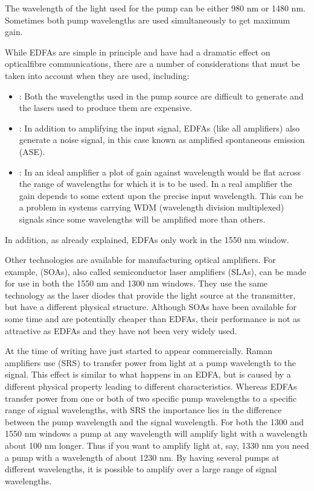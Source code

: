 \documentclass[letterpaper,10pt,english]{sphinxmanual}
\begin{document}
The wavelength of the light used for the pump can be either 980 nm or 1480 nm. Sometimes both pump wavelengths are used simultaneously to get maximum gain.

While EDFAs are simple in principle and have had a dramatic effect on optical\sphinxhyphen{}fibre communications, there are a number of considerations that must be taken into account when they are used, including:
\begin{itemize}
\item {} 
: Both the wavelengths used in the pump source are difficult to generate and the lasers used to produce them are expensive.

\item {} 
: In addition to amplifying the input signal, EDFAs (like all amplifiers) also generate a noise signal, in this case known as amplified spontaneous emission (ASE).

\item {} 
: In an ideal amplifier a plot of gain against wavelength would be flat across the range of wavelengths for which it is to be used. In a real amplifier the gain depends to some extent upon the precise input wavelength. This can be a problem in systems carrying WDM (wavelength division multiplexed) signals since some wavelengths will be amplified more than others.

\end{itemize}

In addition, as already explained, EDFAs only work in the 1550 nm window.

Other technologies are available for manufacturing optical amplifiers. For example,  (SOAs), also called semiconductor laser amplifiers (SLAs), can be made for use in both the 1550 nm and 1300 nm windows. They use the same technology as the laser diodes that provide the light source at the transmitter, but have a different physical structure. Although SOAs have been available for some time and are potentially cheaper than EDFAs, their performance is not as
attractive as EDFAs and they have not been very widely used.

At the time of writing  have just started to appear commercially. Raman amplifiers use  (SRS) to transfer power from light at a pump wavelength to the signal. This effect is similar to what happens in an EDFA, but is caused by a different physical property leading to different characteristics. Whereas EDFAs transfer power from one or both of two specific pump wavelengths to a specific range of signal wavelengths, with SRS the importance lies in the
difference between the pump wavelength and the signal wavelength. For both the 1300 and 1550 nm windows a pump at any wavelength will amplify light with a wavelength about 100 nm longer. Thus if you want to amplify light at, say, 1330 nm you need a pump with a wavelength of about 1230 nm. By having several pumps at different wavelengths, it is possible to amplify over a large range of signal wavelengths.
\end{document}
